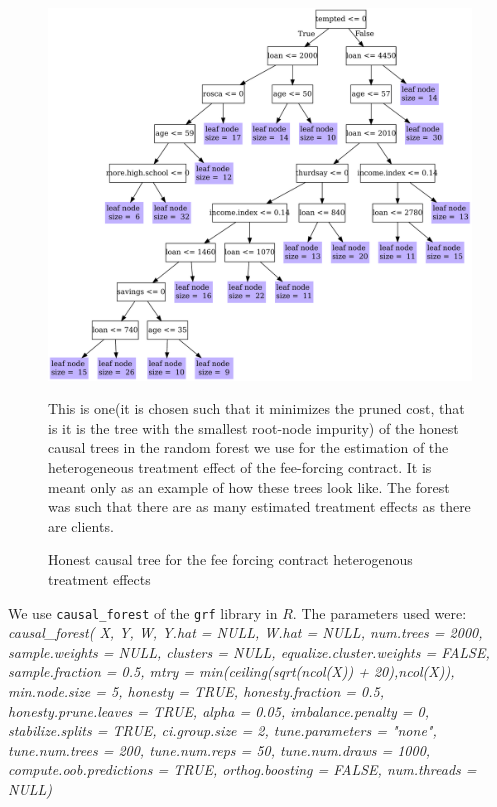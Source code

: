 \documentclass[oneside,11pt]{article}
\begin{document}
\vspace{.3in}
\begin{figure}[H]
        \caption{Honest causal tree for the fee forcing contract heterogenous treatment effects}
    \label{casual_tree}
    \begin{center}
        \centering
        \includegraphics[width=.8\textwidth]{Figuras/crf_pro_2_fc_admin_disc.pdf}
    \end{center}
    \footnotesize 
    This is one(it is chosen such that it minimizes the pruned cost, that is it is the tree with the smallest root-node impurity) of the honest causal trees in the random forest we use for the estimation of the heterogeneous treatment effect of the fee-forcing contract. It is meant only as an example of how these trees look like. The forest was such that there are as many estimated treatment effects as there are clients.
\end{figure}

We use \cite{atheygrf} \texttt{causal\_forest} of the \texttt{grf} library in $R$. The parameters used were:
\scriptsize{\textit{causal\_forest(
  X, 
  Y, 
  W, 
  Y.hat = NULL, 
  W.hat = NULL, 
  num.trees = 2000, 
  sample.weights = NULL, 
  clusters = NULL, 
  equalize.cluster.weights = FALSE, 
  sample.fraction = 0.5, 
  mtry = min(ceiling(sqrt(ncol(X)) + 20),ncol(X)), 
  min.node.size = 5, 
  honesty = TRUE, 
  honesty.fraction = 0.5, 
  honesty.prune.leaves = TRUE, 
  alpha = 0.05, 
  imbalance.penalty = 0, 
  stabilize.splits = TRUE, 
  ci.group.size = 2, 
  tune.parameters = "none", 
  tune.num.trees = 200, 
  tune.num.reps = 50, 
  tune.num.draws = 1000, 
  compute.oob.predictions = TRUE, 
  orthog.boosting = FALSE, 
  num.threads = NULL)}}
\end{document}
